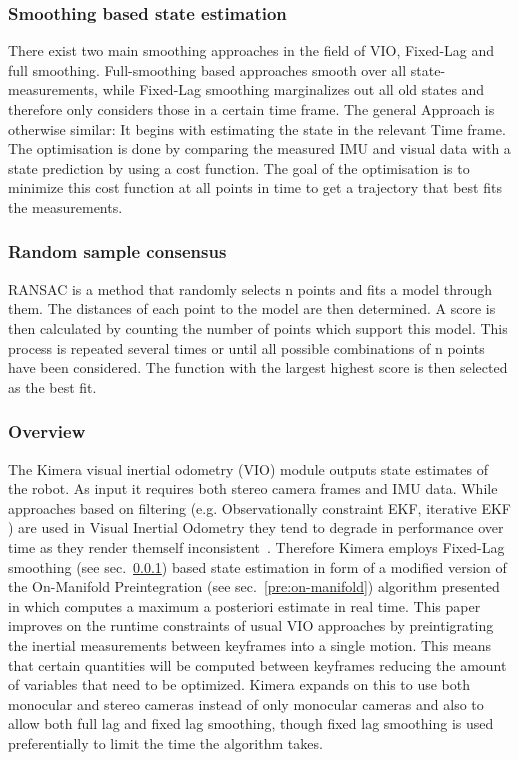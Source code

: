 \documentclass[11pt,a4paper]{article}
\begin{document}
\subsubsection{Smoothing based state estimation} \label{Pre:Smoothing}
There exist two main smoothing approaches in the field of VIO, Fixed-Lag and full smoothing.
Full-smoothing based approaches smooth over all state-measurements, while Fixed-Lag smoothing marginalizes out all old states and therefore only considers those in a certain time frame.
The general Approach is otherwise similar: It begins with estimating the state in the relevant Time frame.
The optimisation is done by comparing the measured IMU and visual data with a state prediction by using a cost function. 
The goal of the optimisation is to minimize this cost function at all points in time to get a trajectory that best fits the measurements.

\subsubsection{Random sample consensus} \label{sec:RANSAC}
RANSAC is a method that randomly selects n points and fits a model through them.
The distances of each point to the model are then determined. 
A score is then calculated by counting the number of points which support this model.
This process is repeated several times or until all possible combinations of n points have been considered. 
The function with the largest highest score is then selected as the best fit.

\subsubsection{Overview} \label{Sec:K-VIO overview}
The Kimera visual inertial odometry (VIO) module outputs state estimates of the robot.
As input it requires both stereo camera frames and IMU data. 
While approaches based on filtering (e.g. Observationally constraint EKF, iterative EKF ) are used in Visual Inertial Odometry they tend to degrade in performance over time as they render themself inconsistent~\cite{Forster_2017}. 
Therefore Kimera employs Fixed-Lag smoothing (see sec.~\ref{Pre:Smoothing}) based state estimation in form of  a modified version of the On-Manifold Preintegration (see sec.~\ref{pre:on-manifold}) algorithm presented in \cite{Forster_2017} which computes a maximum a posteriori estimate in real time. 
This paper improves on the runtime constraints of usual VIO approaches by preintigrating the inertial measurements between keyframes into a single motion. 
This means that certain quantities will be computed between keyframes reducing the amount of variables that need to be optimized. 
Kimera expands on this to use both monocular and stereo cameras instead of only monocular cameras and also to allow both full lag and fixed lag smoothing, though fixed lag smoothing is used preferentially to limit the time the algorithm takes.
\end{document}
